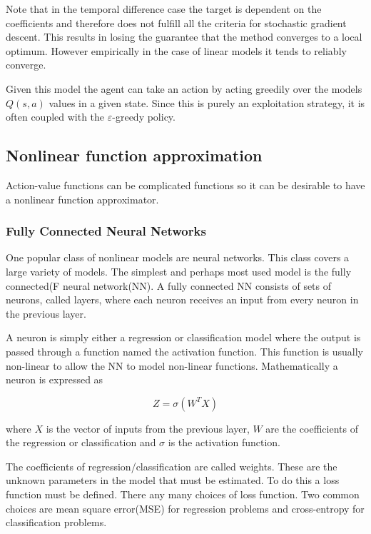 Note that in the temporal difference case the target is dependent on the coefficients and therefore does not fulfill all the criteria for stochastic gradient descent. This results in losing the guarantee that the method converges to a local optimum. However empirically in the case of linear models it tends to reliably converge.

Given this model the agent can take an action by acting greedily over the models $Q(s,a)$ values in a given state. Since this is purely an exploitation strategy, it is often coupled with the $\varepsilon$-greedy policy.

\subsection{Nonlinear function approximation}

Action-value functions can be complicated functions so it can be desirable to have a nonlinear function approximator.

\subsubsection{Fully Connected Neural Networks}

One popular class of nonlinear models are neural networks. This class covers a large variety of models. The simplest and perhaps most used model is the fully connected(F neural network(NN). A fully connected NN consists of sets of neurons, called layers, where each neuron receives an input from every neuron in the previous layer.

A neuron is simply either a regression or classification model where the output is passed through a function named the activation function. This function is usually non-linear to allow the NN to model non-linear functions. Mathematically a neuron is expressed as 

\begin{equation}
    Z = \sigma(W^TX)
\end{equation}

where $X$ is the vector of inputs from the previous layer, $W$ are the coefficients of the regression or classification and $\sigma$ is the activation function.

The coefficients of regression/classification are called weights. These are the unknown parameters in the model that must be estimated. To do this a loss function must be defined. There any many choices of loss function. Two common choices are mean square error(MSE) for regression problems and cross-entropy for classification problems. 

